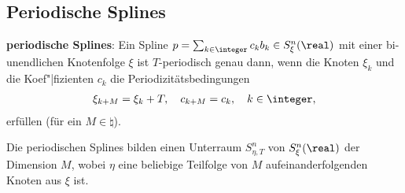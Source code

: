 \subsection{%
    Periodische Splines%
}

\textbf{periodische Splines}:
Ein Spline $p = \sum_{k \in \integer} c_k b_k \in S_\xi^n(\real)$
mit einer bi-unendlichen Knotenfolge $\xi$ ist $T$-periodisch genau dann,
wenn die Knoten $\xi_k$ und die Koef"|fizienten $c_k$ die Periodizitätsbedingungen
\begin{align*}
    \xi_{k+M} = \xi_k + T,\quad
    c_{k+M} = c_k,\quad
    k \in \integer,
\end{align*}
erfüllen (für ein $M \in \natural$).

Die periodischen Splines bilden einen Unterraum $S_{\eta,T}^n$ von $S_\xi^n(\real)$
der Dimension $M$, wobei $\eta$ eine beliebige Teilfolge von $M$ aufeinanderfolgenden Knoten aus
$\xi$ ist.

\pagebreak
